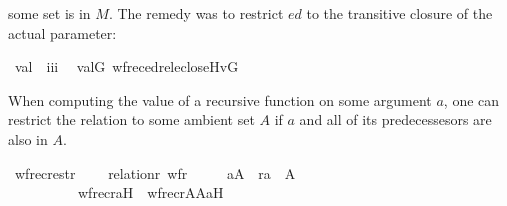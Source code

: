 some set is in $M$. The remedy was to restrict $\mathit{ed}$ to the
transitive closure of the actual parameter:
\begin{isabelle}
\isamarkupfalse%
\isanewline
\ val\ {\isacharcolon}{\isacharcolon}\ {\isachardoublequoteopen}i{\isasymRightarrow}i{\isasymRightarrow}i{\isachardoublequoteclose}\ \isanewline
\ {\isachardoublequoteopen}val{\isacharparenleft}G{\isacharcomma}{\isasymtau}{\isacharparenright}{\isacharequal}{\isacharequal}\ wfrec{\isacharparenleft}edrel{\isacharparenleft}eclose{\isacharparenleft}{\isacharbraceleft}{\isasymtau}{\isacharbraceright}{\isacharparenright}{\isacharparenright}{\isacharcomma}{\isasymtau}{\isacharcomma}Hv{\isacharparenleft}G{\isacharparenright}{\isacharparenright}{\isachardoublequoteclose}
\end{isabelle}
When computing the value of a recursive function on some argument $a$,
one can restrict the relation to some ambient set $A$ if $a$ and
all of its predecessesors are also in $A$.
\begin{isabelle}
\isamarkupfalse%
\ wfrec{\isacharunderscore}restr\ {\isacharcolon}\isanewline
\ \ \ {\isachardoublequoteopen}relation{\isacharparenleft}r{\isacharparenright}{\isachardoublequoteclose}\ {\isachardoublequoteopen}wf{\isacharparenleft}r{\isacharparenright}{\isachardoublequoteclose}\ \isanewline
\ \ \ \ {\isachardoublequoteopen}a{\isasymin}A\ {\isasymLongrightarrow}\ {\isacharparenleft}r{\isacharcircum}{\isacharplus}{\isacharparenright}{\isacharminus}{\isacharbackquote}{\isacharbackquote}{\isacharbraceleft}a{\isacharbraceright}\ {\isasymsubseteq}\ A\ {\isasymLongrightarrow}\ \isanewline
\ \ \ \ \ \ \ \ \ \ wfrec{\isacharparenleft}r{\isacharcomma}a{\isacharcomma}H{\isacharparenright}\ {\isacharequal}\ wfrec{\isacharparenleft}r{\isasyminter}A{\isasymtimes}A{\isacharcomma}a{\isacharcomma}H{\isacharparenright}{\isachardoublequoteclose}
\end{isabelle}

\medskip
\noindent{}
\medskip

